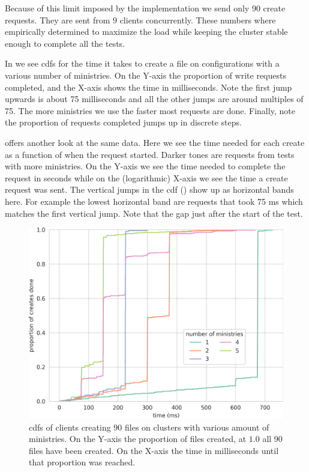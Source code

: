 Because of this limit imposed by the implementation we send only 90 create requests. They are sent from 9 clients concurrently. These numbers where empirically determined to maximize the load while keeping the cluster stable enough to complete all the tests.

In  we see \acp{cdf} for the time it takes to create a file on configurations with a various number of ministries. On the Y-axis the proportion of write requests completed, and the X-axis shows the time in milliseconds. Note the first jump upwards is about 75 milliseconds and all the other jumps are around multiples of 75. The more ministries we use the faster most requests are done. Finally, note the proportion of requests completed jumps up in discrete steps.

 offers another look at the same data. Here we see the time needed for each create as a function of when the request started. Darker tones are requests from tests with more ministries. On the Y-axis we see the time needed to complete the request in seconds while on the (logarithmic) X-axis we see the time a create request was sent. The vertical jumps in the \ac{cdf} () show up as horizontal bands here. For example the lowest horizontal band are requests that took 75 ms which matches the first vertical jump. Note that the gap just after the start of the test.

\begin{figure}[htbp]
	\centering
	\includegraphics[height=\textheight]{../results/plots/touch.png}
	\caption{\acp{cdf} of clients creating 90 files on clusters with various amount of ministries. On the Y-axis the proportion of files created, at $1.0$ all 90 files have been created. On the X-axis the time in milliseconds until that proportion was reached.}
	\label{fig:touch}
\end{figure}

